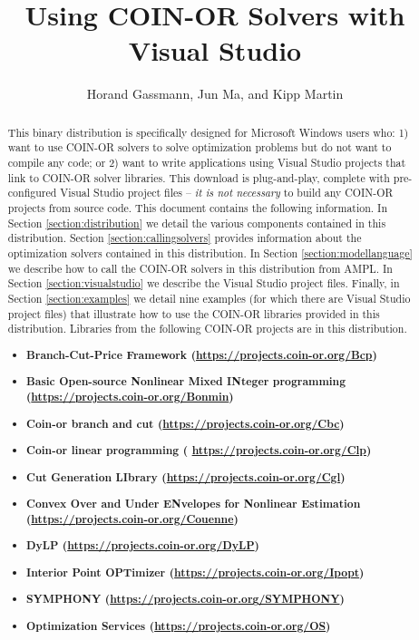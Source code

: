 \documentclass[11pt]{article}
\renewcommand{\_}{{\char"5F}}
\renewcommand{\{}{{\char"7B}}
\renewcommand{\}}{{\char"7D}}
\renewcommand{\^}{{\char"0D}}
\renewcommand{\'}{{\char"0D}}
\begin{document}
\title{Using COIN-OR Solvers with Visual Studio}
\vskip 2in
\author{Horand Gassmann, Jun Ma,  and  Kipp Martin}
\maketitle

\begin{abstract}
This binary distribution is specifically designed for Microsoft Windows users who: 1) want to use COIN-OR solvers to solve optimization problems but do not want to compile any code; or 2) want to write applications using Visual Studio projects that link to COIN-OR solver libraries.  This download is plug-and-play, complete with pre-configured Visual Studio project files -- {\it it is not necessary} to build any COIN-OR projects from source code.  This document contains the following information. In Section \ref{section:distribution} we detail the various components contained in this distribution.  Section \ref{section:callingsolvers} provides information about the optimization solvers contained in this distribution.  In Section \ref{section:modellanguage} we describe how to call the COIN-OR solvers in this distribution from AMPL. In Section \ref{section:visualstudio} we describe the Visual Studio project files.  Finally, in Section \ref{section:examples} we detail nine examples (for which there are Visual Studio project files) that illustrate how to use the COIN-OR libraries provided in this distribution.  Libraries from the following COIN-OR projects are in this distribution.

\begin{itemize}
\item[] {\bf Branch-Cut-Price Framework (\url{https://projects.coin-or.org/Bcp}) }
\item[] {\bf Basic Open-source Nonlinear Mixed INteger programming  (\url{https://projects.coin-or.org/Bonmin})}
\item[] {\bf Coin-or branch and cut (\url{https://projects.coin-or.org/Cbc})}
\item[] {\bf Coin-or linear programming ( \url{https://projects.coin-or.org/Clp})}
\item[] {\bf Cut Generation LIbrary (\url{https://projects.coin-or.org/Cgl})}
\item[] {\bf Convex Over and Under ENvelopes for Nonlinear Estimation (\url{https://projects.coin-or.org/Couenne})}
\item[] {\bf DyLP (\url{https://projects.coin-or.org/DyLP})}
\item[] {\bf Interior Point OPTimizer  (\url{https://projects.coin-or.org/Ipopt})}
\item[] {\bf SYMPHONY (\url{https://projects.coin-or.org/SYMPHONY})}
\item[] {\bf Optimization Services (\url{https://projects.coin-or.org/OS}) }
\end{itemize}



\end{abstract}
\end{document}
